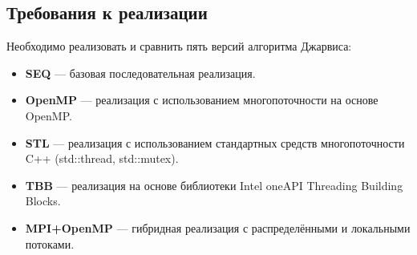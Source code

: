 \documentclass[a4paper,12pt]{article}
\begin{document}
\subsection*{Требования к реализации}

Необходимо реализовать и сравнить пять версий алгоритма Джарвиса:
\begin{itemize}
    \item \textbf{SEQ} — базовая последовательная реализация.
    \item \textbf{OpenMP} — реализация с использованием многопоточности на основе OpenMP.
    \item \textbf{STL} — реализация с использованием стандартных средств многопоточности C++ (std::thread, std::mutex).
    \item \textbf{TBB} — реализация на основе библиотеки Intel oneAPI Threading Building Blocks.
    \item \textbf{MPI+OpenMP} — гибридная реализация с распределёнными и локальными потоками.
\end{itemize}
\end{document}
